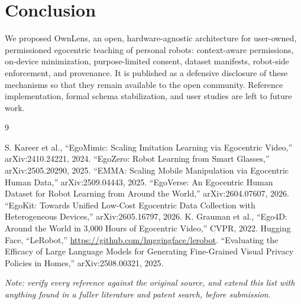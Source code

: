 \documentclass[10pt,twocolumn,letterpaper]{article}
\begin{document}
\section{Conclusion}

We proposed OwnLens, an open, hardware-agnostic architecture for user-owned, permissioned egocentric teaching of personal robots: context-aware permissions, on-device minimization, purpose-limited consent, dataset manifests, robot-side enforcement, and provenance. It is published as a defensive disclosure of these mechanisms so that they remain available to the open community. Reference implementation, formal schema stabilization, and user studies are left to future work.

\begin{thebibliography}{9}

 S. Kareer et al., ``EgoMimic: Scaling Imitation Learning via Egocentric Video,'' arXiv:2410.24221, 2024.
 ``EgoZero: Robot Learning from Smart Glasses,'' arXiv:2505.20290, 2025.
 ``EMMA: Scaling Mobile Manipulation via Egocentric Human Data,'' arXiv:2509.04443, 2025.
 ``EgoVerse: An Egocentric Human Dataset for Robot Learning from Around the World,'' arXiv:2604.07607, 2026.
 ``EgoKit: Towards Unified Low-Cost Egocentric Data Collection with Heterogeneous Devices,'' arXiv:2605.16797, 2026.
 K. Grauman et al., ``Ego4D: Around the World in 3,000 Hours of Egocentric Video,'' CVPR, 2022.
 Hugging Face, ``LeRobot,'' \url{https://github.com/huggingface/lerobot}.
 ``Evaluating the Efficacy of Large Language Models for Generating Fine-Grained Visual Privacy Policies in Homes,'' arXiv:2508.00321, 2025.

\end{thebibliography}

\textit{Note: verify every reference against the original source, and extend this list with anything found in a fuller literature and patent search, before submission.}
\end{document}
